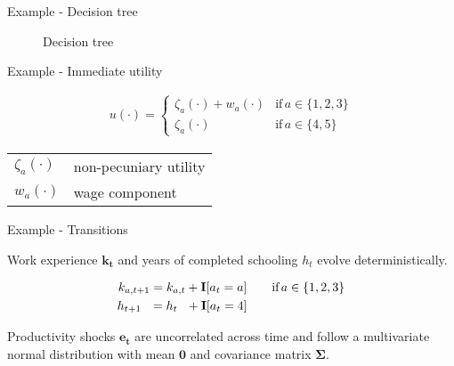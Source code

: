 \begin{frame}{Example - Decision tree}
\begin{figure}
  \caption{Decision tree}
  \scalebox{0.55}{}
\end{figure}
\end{frame}
\begin{frame}{Example - Immediate utility}

  \begin{align*}
  u(\cdot) =
  \begin{cases}
      \zeta_a(\cdot)  + w_a(\cdot)                & \text{if}\, a \in \{1, 2, 3\}  \\
      \zeta_a(\cdot)                                                  &  \text{if}\, a \in \{4, 5\}
  \end{cases}
  \end{align*}

\begin{table}[]
	\hskip1.5cm
	\begin{tabular}{ll}
	$\zeta_a(\cdot)$	& non-pecuniary utility \\[1.0em]
	$w_a(\cdot) $	& wage component
	\end{tabular}
\end{table}

\end{frame}
\begin{frame}{Example - Transitions}

  Work experience $\bm{k_t}$  and years of completed schooling $h_t$ evolve deterministically.

  \begin{align*}
  k_{a,t+1} = k_{a,t} + {\textbf{I}}[a_t = a]  &\qquad \text{if}\, a \in \{1, 2, 3\} \\
  h_{t + 1\phantom{,a}} = h_{t\phantom{,a}} +   {\textbf{I}}[a_t = 4]  &\qquad\\
  \end{align*}

  Productivity shocks $\bm{e_t}$ are uncorrelated across time and follow a multivariate normal distribution with mean $\bm{0}$ and covariance matrix $\bm{\Sigma}$.

\end{frame}
